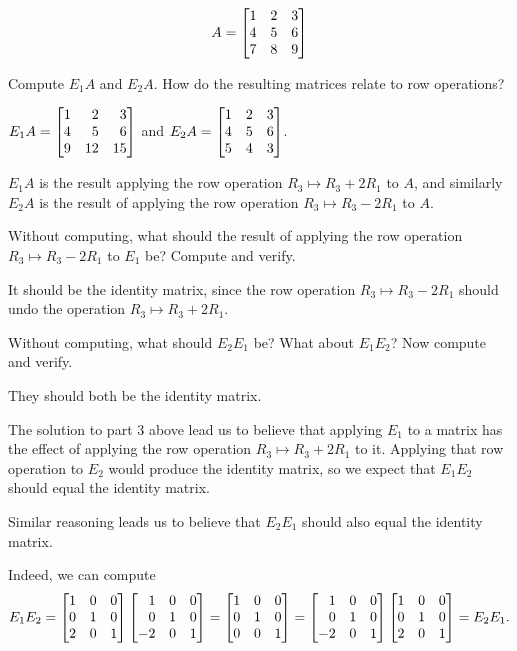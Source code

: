 \documentclass{problemset}
\begin{document}

	\[
		A=\mat{1&2&3\\4&5&6\\7&8&9}
	\]
	\begin{parts}[resume]
		\item Compute $E_1A$ and $E_2A$. How do the resulting matrices relate to row
		operations?
			\begin{solution}
				$E_1A=\mat{1&2&3\\4&5&6\\9&12&15}$ and $E_2A=\mat{1&2&3\\4&5&6\\5&4&3}$.

				$E_1A$ is the result applying the row operation $R_3\mapsto R_3+2R_1$
				to $A$, and similarly $E_2A$ is the result of applying the row
				operation $R_3\mapsto R_3-2R_1$ to $A$.
			\end{solution}
		\item Without computing, what should the result of applying the row
		operation $R_3\mapsto R_3-2R_1$ to $E_1$ be? Compute and verify.
			\begin{solution}
				It should be the identity matrix, since the row operation
				$R_3\mapsto R_3-2R_1$ should undo the operation $R_3\mapsto R_3+2R_1$.
			\end{solution}
		\item Without computing, what should $E_2E_1$ be? What about $E_1E_2$?
		Now compute and verify.
			\begin{solution}
				They should both be the identity matrix.

				The solution to part 3 above lead us to believe that applying $E_1$
				to a matrix has the effect of applying the row operation $R_3\mapsto R_3+2R_1$
				to it. Applying that row operation to $E_2$ would produce the
				identity matrix, so we expect that $E_1E_2$ should equal the
				identity matrix.

				Similar reasoning leads us to believe that $E_2E_1$ should also
				equal the identity matrix.

				Indeed, we can compute
				\[
					E_1E_2
					=\mat{1&0&0\\0&1&0\\2&0&1}\mat{1&0&0\\0&1&0\\-2&0&1}
					=\mat{1&0&0\\0&1&0\\0&0&1}
					=\mat{1&0&0\\0&1&0\\-2&0&1}\mat{1&0&0\\0&1&0\\2&0&1}
					=E_2E_1.
				\]
			\end{solution}
	\end{parts}
\end{document}
